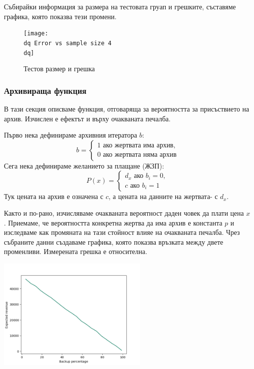 \documentclass[11pt, a4paper]{article}
\theoremstyle{definition}
\begin{document}
				Събирайки информация за размера на тестовата груап и грешките, съставяме графика, която показва тези промени.
				\begin{figure}[H]
				\begin{minipage}{1.0\textwidth}
					\centering
					\texttt{[image: \\dq Error vs sample size 4\\dq]}
					\caption{Тестов размер и грешка}\label{Fig:Data5}
				\end{minipage}
				\end{figure}
			\subsubsection{Архивираща функция}
				В тази секция описваме функция, отговаряща за вероятността за присъствието на архив. Изчислен е ефектът и върху очакваната печалба.\par
				Първо нека дефинираме архивния итератора $b$: 
				$$
				b=
				\begin{cases}
					1 \text{ ако жертвата има архив},\\
					0 \text{ ако жертвата няма архив}
				\end{cases}
				$$
				Сега нека дефинираме желанието за плащане (ЖЗП):
				$$
				P(x)=
				\begin{cases}
				d_{x} \text{ ако } b_{i}=0,\\
				c \text{ ако } b_{i}=1
				\end{cases}
				$$
				Тук цената на архив е означена с $c$, а цената на данните на жертвата- с $d_{x}$.\par
				Както и по-рано, изчисляваме очакваната вероятност даден човек да плати цена $x$.
				Приемаме, че вероятността конкретна жертва да има архив е константа $p$ и изследваме как промяната на тази стойност влияе на очакваната печалба. Чрез събраните данни създаваме графика, която показва връзката между двете променливи. Измерената грешка е относителна.
				\begin{center}
					\includegraphics[width=0.55\textwidth]{Revenue_vs_backup}
				\end{center}		
\end{document}
